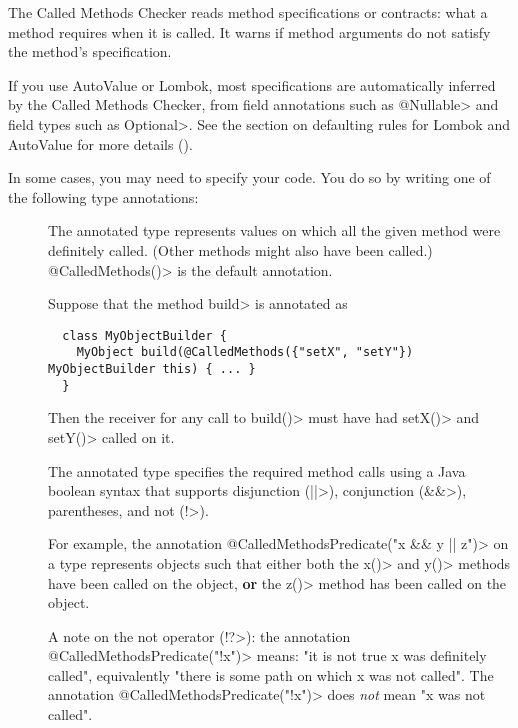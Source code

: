 
The Called Methods Checker reads method specifications or contracts:  what a method requires when it is called.
It warns if method arguments do not satisfy the method's specification.

If you use AutoValue or Lombok, most specifications are automatically
inferred by the Called Methods Checker, from field annotations such as
\<@Nullable> and field types such as \<Optional>. See the
section on defaulting rules for Lombok and AutoValue for more details
().

In some cases, you may need to specify your code. You do so by writing one of the following type
annotations:
\begin{description}
\item[]
  The annotated type represents values on which all the given method were definitely called.
  (Other methods might also have been called.) \<@CalledMethods()> is the default annotation.

  Suppose that the method \<build> is annotated as

  \begin{Verbatim}
  class MyObjectBuilder {
    MyObject build(@CalledMethods({"setX", "setY"}) MyObjectBuilder this) { ... }
  }
  \end{Verbatim}

  Then the receiver for any call to \<build()> must have had \<setX()> and \<setY()> called on it.

\item[]
  The annotated type specifies the required method calls using a Java boolean syntax that supports
  disjunction (\<||>), conjunction (\<\&\&>), parentheses, and not (\<!>).

  For example, the annotation \<@CalledMethodsPredicate("x \&\& y || z")> on a type represents
  objects such that either both the  \<x()> and \<y()> methods have been called on the object, \textbf{or}
  the \<z()> method has been called on the object.

  A note on the not operator (\<!?>): the annotation \<@CalledMethodsPredicate("!x")> means: "it is not true x was
  definitely called", equivalently "there is some path on which x was not called".
  The annotation \<@CalledMethodsPredicate("!x")> does \emph{not} mean "x was not called".


\end{description}
